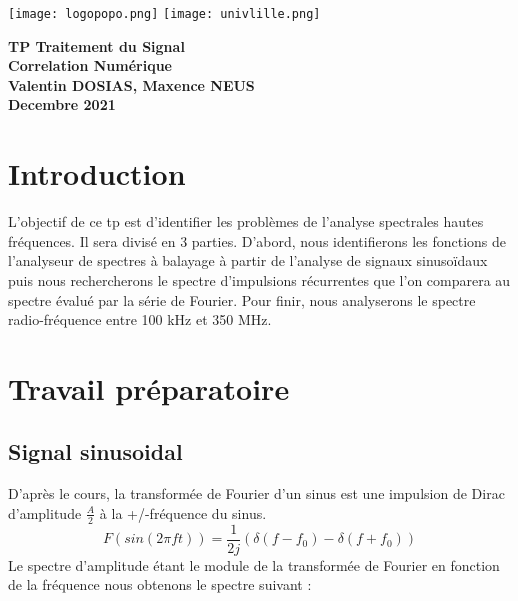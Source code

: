 \documentclass[oneside,a4paper,12pt]{article}
\begin{document}
	\begin{titlepage}
		\texttt{[image: logopopo.png]}
		\hspace*{\fill}
		\texttt{[image: univlille.png]}
		
		\begin{center}
			\vspace{1cm}
			\textbf{TP Traitement du Signal}\\
			\textbf{Correlation Numérique}\\
			\vspace{1cm}
			\textbf{Valentin DOSIAS, Maxence NEUS}\\
			\vspace{3cm}
			\vspace{\fill}
			\textbf{Decembre 2021}\\
		\end{center}
	\end{titlepage}
	
	\tableofcontents
	
	\section{Introduction}
		L’objectif de ce tp est d’identifier les problèmes de l’analyse spectrales hautes fréquences. Il sera divisé en 3 parties. D’abord, nous identifierons les fonctions de l’analyseur de spectres à balayage à partir de l’analyse de signaux sinusoïdaux puis nous rechercherons le spectre d’impulsions récurrentes que l’on comparera au spectre évalué par la série de Fourier. Pour finir, nous analyserons le spectre radio-fréquence entre 100 kHz et 350 MHz.
	
	\newpage
	
	\section{Travail préparatoire}
	
	\subsection{Signal sinusoidal}
	
		D’après le cours, la transformée de Fourier d’un sinus est une impulsion de Dirac d’amplitude $\frac{A}{2}$ à la +/-fréquence du sinus.
		$$ F(sin(2 \pi f t)) = \frac{1}{2j}(\delta(f-f_{0}) - \delta(f+f_{0})) $$
		Le spectre d’amplitude étant le module de la transformée de Fourier en fonction de la fréquence nous obtenons le spectre suivant : 
		
\end{document}
